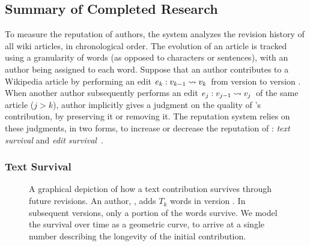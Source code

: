 \subsection{Summary of Completed Research}

To measure the reputation of authors, the system analyzes
the revision history of all wiki articles, in
chronological order.
The evolution of an article is tracked using a granularity
of words (as opposed to characters or sentences),
with an author being assigned to each word.
Suppose that an author  contributes to a Wikipedia article by
performing an edit $e_{k}: v_{k-1} \rightsquigarrow v_{k}$
from version  to
version .
When another author  subsequently performs an edit
$e_{j}: v_{j-1} \rightsquigarrow v_{j}$
of the same article ($j > k$), author 
implicitly gives a judgment on the quality of 's contribution, by
preserving it or removing it.
The reputation system relies on these judgments, in two forms, to increase
or decrease the reputation of : \textit{text survival}
and \textit{edit survival}~\cite{www07}.

\subsubsection*{Text Survival}

\begin{figure}[t]
\centering
{}
\hspace{1ex}
\caption{A graphical depiction of how a text contribution survives
	through future revisions.
	An author, , adds $T_k$ words in version .
	In subsequent versions, only a portion of the words survive.
	We model the survival over time as a geometric curve,
	to arrive at a single number describing the longevity
	of the initial contribution.}
\label{fig-textsurvival}
\end{figure}



